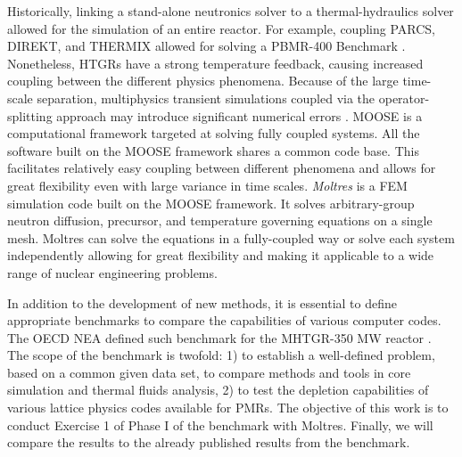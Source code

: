 \documentclass[11pt,letterpaper]{article}
\begin{document}
Historically, linking a stand-alone neutronics solver to a thermal-hydraulics solver allowed for the simulation of an entire reactor.
For example, coupling PARCS, DIREKT, and THERMIX \cite{seker_analysis_2006} allowed for solving a \gls{PBMR}-400 Benchmark \cite{reitsma_oecdneansc_2006}.
Nonetheless, \glspl{HTGR} have a strong temperature feedback, causing increased coupling between the different physics phenomena.
Because of the large time-scale separation, multiphysics transient simulations coupled via the operator-splitting approach may introduce significant numerical errors \cite{ragusa_consistent_2009} \cite{park_tightly_2010}.
\gls{MOOSE} \cite{gaston_moose_2009} \cite{gaston_physics-based_2015} is a computational framework targeted at solving fully coupled systems.
All the software built on the \gls{MOOSE} framework shares a common code base.
This facilitates relatively easy coupling \cite{novak_pronghorn_2018} between different phenomena and allows for great flexibility even with large variance in time scales.
\textit{Moltres} \cite{lindsay_introduction_2018} is a \gls{FEM} simulation code built on the \gls{MOOSE} framework.
It solves arbitrary-group neutron diffusion, precursor, and temperature governing equations on a single mesh.
Moltres can solve the equations in a fully-coupled way or solve each system independently allowing for great flexibility and making it applicable to a wide range of nuclear engineering problems.

In addition to the development of new methods, it is essential to define appropriate benchmarks to compare the capabilities of various computer codes.
The \gls{OECD} \gls{NEA} defined such benchmark for the \gls{MHTGR}-350 MW reactor \cite{oecd_nea_benchmark_2017}.
The scope of the benchmark is twofold: 1) to establish a well-defined problem, based on a common given data set, to compare methods and tools in core simulation and thermal fluids analysis, 2) to test the depletion capabilities of various lattice physics codes available for \glspl{PMR}.
The objective of this work is to conduct Exercise 1 of Phase I of the benchmark with Moltres.
Finally, we will compare the results to the already published results from the benchmark.
\end{document}
